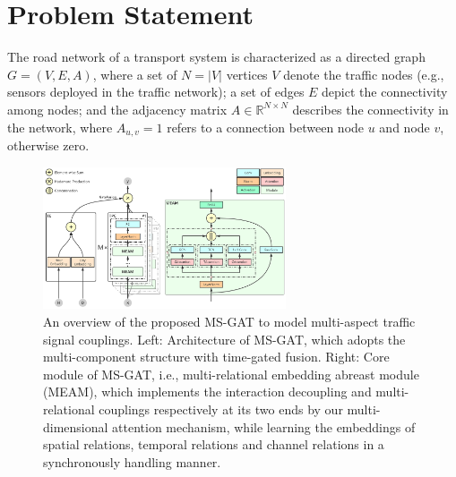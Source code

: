 \section{Problem Statement}
\label{sec:problem_statement}

The road network of a transport system is characterized as a directed graph $G = (V, E, A)$, where a set of $N = |V|$ vertices $V$ denote the traffic nodes (e.g., sensors deployed in the traffic network); a set of edges $E$ depict the connectivity among nodes; and the adjacency matrix $A \in \mathbb{R}^{N \times N}$ describes the connectivity in the network, where $A_{u,v}=1$ refers to a connection between node $u$ and node $v$, otherwise zero.

\begin{figure}[!ht]
    \centering
    \includegraphics[width=0.64\textwidth]{pictures/Framework.png}
    \caption{An overview of the proposed MS-GAT to model multi-aspect traffic signal couplings. Left: Architecture of MS-GAT, which adopts the multi-component structure with time-gated fusion. Right: Core module of MS-GAT, i.e., multi-relational embedding abreast module (MEAM), which implements the interaction decoupling and multi-relational couplings respectively at its two ends by our multi-dimensional attention mechanism, while learning the embeddings of spatial relations, temporal relations and channel relations in a synchronously handling manner.}
    \label{fig:framework}
\end{figure}

